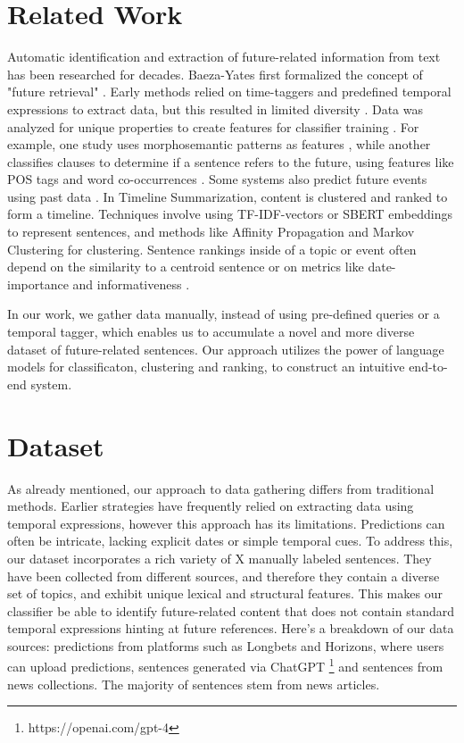 \documentclass[sigconf]{acmart}
\begin{document}
\section{Related Work}
Automatic identification and extraction of future-related information from text has been researched for decades. Baeza-Yates \cite{BaezaYatesSearchingTF} first formalized the concept of "future retrieval" . Early methods relied on time-taggers and predefined temporal expressions to extract data, but this resulted in limited diversity \cite{chronoseeker, supportingAnalysis, analyzingCollective, rankingRelated, extractingCollective}. Data was analyzed for unique properties \cite{improvingRetrieval} to create features for classifier training \cite{computationalExploration}.
For example, one study uses morphosemantic patterns as features \cite{automaticExtraction}, while another classifies clauses to determine if a sentence refers to the future, using features like POS tags and word co-occurrences \cite{extractingPredictive}. Some systems also predict future events using past data \cite{miningTheWeb, predictingTheNews}.
In Timeline Summarization, content is clustered and ranked to form a timeline. Techniques involve using TF-IDF-vectors or SBERT embeddings \cite{sbert} to represent sentences, and methods like Affinity Propagation \cite{abstractiveTimeline, multiTimeline} and Markov Clustering \cite{stateOfTheArtTimeline} for clustering. Sentence rankings inside of a topic or event often depend on the similarity to a centroid sentence \cite{stateOfTheArtTimeline} or on metrics like date-importance and informativeness \cite{abstractiveTimeline}.

In our work, we gather data manually, instead of using pre-defined queries or a temporal tagger, which enables us to accumulate a novel and more diverse dataset of future-related sentences. Our approach utilizes the power of language models for classificaton, clustering and ranking, to construct an intuitive end-to-end system.



\section{Dataset}
As already mentioned, our approach to data gathering differs from traditional methods. Earlier strategies have frequently relied on extracting data using temporal expressions, however this approach has its limitations. Predictions can often be intricate, lacking explicit dates or simple temporal cues.
To address this, our dataset incorporates a rich variety of X manually labeled sentences. They have been collected from different sources, and therefore they contain a diverse set of topics, and exhibit unique lexical and structural features. This makes our classifier be able to identify future-related content that does not contain standard temporal expressions hinting at future references.
Here's a breakdown of our data sources: predictions from platforms such as Longbets and Horizons, where users can upload predictions, sentences generated via ChatGPT \footnote{https://openai.com/gpt-4} and sentences from news collections. The majority of sentences stem from news articles.
\end{document}
